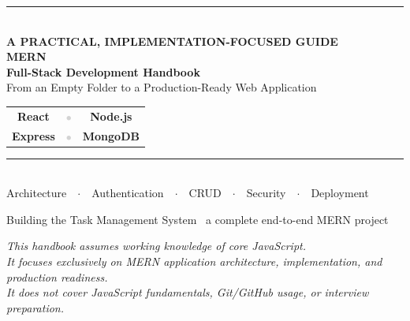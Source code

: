 \documentclass[11pt,oneside]{book}
\begin{document}
\begin{titlepage}
\begin{center}
\vspace*{2.2cm}
{\color{mernblue}\rule{\textwidth}{2pt}}\\[1.6cm]
{\headingfont\bfseries\color{lightgray}\Large A PRACTICAL, IMPLEMENTATION-FOCUSED GUIDE}\\[0.8cm]
{\headingfont\bfseries\color{mernblue}\fontsize{40}{48}\selectfont MERN}\\[0.2cm]
{\headingfont\bfseries\color{mernblue}\fontsize{26}{30}\selectfont Full-Stack Development Handbook}\\[1.4cm]
{\headingfont\color{mernteal}\Large From an Empty Folder to a Production-Ready Web Application}\\[2cm]

\begin{tabular}{ccc}
\textcolor{mernblue}{\Large\bfseries React} & \textcolor{lightgray}{\Large $\bullet$} & \textcolor{mernteal}{\Large\bfseries Node.js}\\[4pt]
\textcolor{mernorange}{\Large\bfseries Express} & \textcolor{lightgray}{\Large $\bullet$} & \textcolor{merngreen}{\Large\bfseries MongoDB}
\end{tabular}

\vspace{2.5cm}
{\color{mernblue}\rule{0.5\textwidth}{1pt}}\\[0.6cm]
{\headingfont\color{lightgray} Architecture\ \ $\cdot$\ \ Authentication\ \ $\cdot$\ \ CRUD\ \ $\cdot$\ \ Security\ \ $\cdot$\ \ Deployment}
\end{center}
\vfill
\begin{center}
{\headingfont\color{lightgray}\small Building the Task Management System \textemdash\ a complete end-to-end MERN project}
\end{center}
\vspace*{1.5cm}
\restoregeometry
\end{titlepage}

\clearpage
\thispagestyle{empty}
\vspace*{4cm}
\begin{center}
{\headingfont\color{lightgray}\itshape This handbook assumes working knowledge of core JavaScript.\\
It focuses exclusively on MERN application architecture, implementation, and production readiness.\\
It does not cover JavaScript fundamentals, Git/GitHub usage, or interview preparation.}
\end{center}
\end{document}
